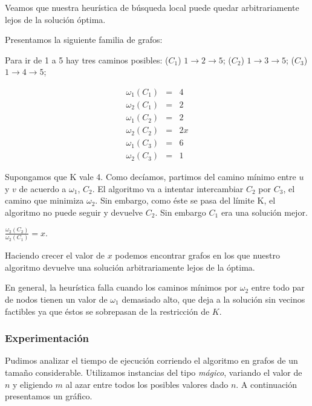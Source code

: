 Veamos que nuestra heurística de búsqueda local puede quedar arbitrariamente lejos de la solución óptima.

Presentamos la siguiente familia de grafos:


Para ir de 1 a 5 hay tres caminos posibles: ($C_1$) $1 \rightarrow 2 \rightarrow 5$; ($C_2$) $1 \rightarrow 3 \rightarrow 5$;
($C_3$) $1 \rightarrow 4 \rightarrow 5$;

\begin{eqnarray}
 \omega_1(C_1) &=& 4	\\ 
 \omega_2(C_1) &=& 2	\\
 \omega_1(C_2) &=& 2	\\
 \omega_2(C_2) &=& 2x   \\
 \omega_1(C_3) &=& 6	\\
 \omega_2(C_3) &=& 1
\end{eqnarray}

Supongamos que K vale 4.
Como decíamos, partimos del camino mínimo entre $u$ y $v$ de acuerdo a $\omega_1$, $C_2$. El algoritmo va a intentar intercambiar $C_2$ por
$C_3$, el camino que minimiza $\omega_2$. Sin embargo, como éste se pasa del límite K, el algoritmo no puede seguir y devuelve $C_2$. Sin
embargo $C_1$ era una solución mejor.

$\frac{\omega_2(C_2)}{\omega_2(C_1)} = x$.

Haciendo crecer el valor de $x$ podemos encontrar grafos en los que nuestro algoritmo devuelve una
solución arbitrariamente lejos de la óptima.

En general, la heurística falla cuando los caminos mínimos por $\omega_2$ entre todo par de nodos tienen un valor de $\omega_1$ demasiado alto, que deja a la solución sin vecinos factibles ya que éstos se sobrepasan de la restricción de $K$.
\newpage

\subsubsection{Experimentación}

Pudimos analizar el tiempo de ejecución corriendo el algoritmo en grafos de un tamaño considerable. Utilizamos instancias del tipo \textit{mágico}, variando el valor de $n$ y eligiendo $m$ al azar entre todos los posibles valores dado $n$.  A continuación presentamos un gráfico.

